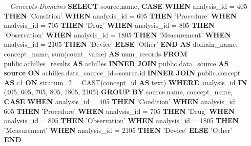 \documentclass[]{book}
\newenvironment{Shaded}{\begin{snugshade}}{\end{snugshade}}
\newcommand{\KeywordTok}[1]{\textcolor[rgb]{0.13,0.29,0.53}{\textbf{#1}}}
\newcommand{\DecValTok}[1]{\textcolor[rgb]{0.00,0.00,0.81}{#1}}
\newcommand{\StringTok}[1]{\textcolor[rgb]{0.31,0.60,0.02}{#1}}
\newcommand{\CommentTok}[1]{\textcolor[rgb]{0.56,0.35,0.01}{\textit{#1}}}
\newcommand{\FunctionTok}[1]{\textcolor[rgb]{0.00,0.00,0.00}{#1}}
\newcommand{\NormalTok}[1]{#1}
\begin{document}
\begin{Shaded}
\begin{Highlighting}[]
\CommentTok{-- Concepts Domains}
\KeywordTok{SELECT}\NormalTok{ source.name,}
    \KeywordTok{CASE} \KeywordTok{WHEN}\NormalTok{ analysis_id = }\DecValTok{405} \KeywordTok{THEN} \StringTok{'Condition'}
    \KeywordTok{WHEN}\NormalTok{ analysis_id = }\DecValTok{605} \KeywordTok{THEN} \StringTok{'Procedure'}
    \KeywordTok{WHEN}\NormalTok{ analysis_id = }\DecValTok{705} \KeywordTok{THEN} \StringTok{'Drug'}
    \KeywordTok{WHEN}\NormalTok{ analysis_id = }\DecValTok{805} \KeywordTok{THEN} \StringTok{'Observation'}
    \KeywordTok{WHEN}\NormalTok{ analysis_id = }\DecValTok{1805} \KeywordTok{THEN} \StringTok{'Measurement'}
    \KeywordTok{WHEN}\NormalTok{ analysis_id = }\DecValTok{2105} \KeywordTok{THEN} \StringTok{'Device'}
    \KeywordTok{ELSE} \StringTok{'Other'} \KeywordTok{END} \KeywordTok{AS}\NormalTok{ domain_name,}
\NormalTok{    concept_name, }\FunctionTok{sum}\NormalTok{(count_value) }\KeywordTok{AS}\NormalTok{ num_records}
\KeywordTok{FROM}\NormalTok{ public.achilles_results }\KeywordTok{AS}\NormalTok{ achilles }
    \KeywordTok{INNER} \KeywordTok{JOIN}\NormalTok{ public.data_source }\KeywordTok{AS} \KeywordTok{source} \KeywordTok{ON} 
\NormalTok{      achilles.data_source_id=source.id}
    \KeywordTok{INNER} \KeywordTok{JOIN}\NormalTok{ public.concept }\KeywordTok{AS}\NormalTok{ c1 }\KeywordTok{ON} 
\NormalTok{      stratum_2 = }\FunctionTok{CAST}\NormalTok{(concept_id }\KeywordTok{AS}\NormalTok{ text)}
\KeywordTok{WHERE}\NormalTok{ analysis_id }\KeywordTok{IN}\NormalTok{ (}\DecValTok{405}\NormalTok{, }\DecValTok{605}\NormalTok{, }\DecValTok{705}\NormalTok{, }\DecValTok{805}\NormalTok{, }\DecValTok{1805}\NormalTok{, }\DecValTok{2105}\NormalTok{)}
\KeywordTok{GROUP} \KeywordTok{BY}\NormalTok{ source.name, concept_name, }
    \KeywordTok{CASE} \KeywordTok{WHEN}\NormalTok{ analysis_id = }\DecValTok{405} \KeywordTok{THEN} \StringTok{'Condition'}
    \KeywordTok{WHEN}\NormalTok{ analysis_id = }\DecValTok{605} \KeywordTok{THEN} \StringTok{'Procedure'}
    \KeywordTok{WHEN}\NormalTok{ analysis_id = }\DecValTok{705} \KeywordTok{THEN} \StringTok{'Drug'}
    \KeywordTok{WHEN}\NormalTok{ analysis_id = }\DecValTok{805} \KeywordTok{THEN} \StringTok{'Observation'}
    \KeywordTok{WHEN}\NormalTok{ analysis_id = }\DecValTok{1805} \KeywordTok{THEN} \StringTok{'Measurement'}
    \KeywordTok{WHEN}\NormalTok{ analysis_id = }\DecValTok{2105} \KeywordTok{THEN} \StringTok{'Device'}
    \KeywordTok{ELSE} \StringTok{'Other'} \KeywordTok{END}
\end{Highlighting}
\end{Shaded}
\end{document}
